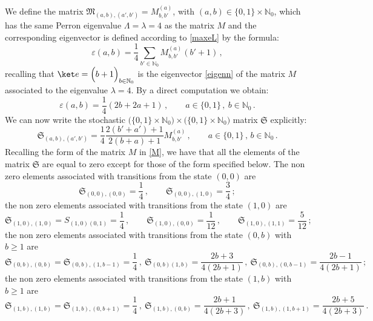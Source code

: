\documentclass[reqno]{amsart}
\theoremstyle{plain}
\theoremstyle{definition}
\theoremstyle{remark}
\numberwithin{equation}{section}
\numberwithin{theorem}{section}
\newcommand{\<}{\langle}
\renewcommand{\>}{\rangle}
\begin{document}
	We define the matrix $\mathfrak M_{(a,b),(a',b')}=M^{(a)}_{b,b'}$, with $(a,b) \in \{0,1\} \times \mathbb{N}_0$, which has the same Perron eigenvalue $\Lambda=\lambda=4$ as the matrix $M$ and the corresponding eigenvector is defined according to \eqref{maxeL} by the formula:
	\begin{equation*}
		\varepsilon(a,b)= \frac{1}{4} \sum_{b' \in \mathbb N_0} M^{(a)}_{b,b'}(b'+1)\,,
	\end{equation*}
	recalling that $\ket e=\Big(b+1\Big)_{b\in \mathbb N_0}$ is the eigenvector \eqref{eigenn} of the matrix $M$ associated to the eigenvalue $\lambda=4$. By a direct computation we obtain:
	\begin{equation*}
		\varepsilon(a,b)= \frac{1}{4} (2b+2a+1)\,, \qquad a\in\{0,1\}\,, \ b\in \mathbb N_0\,.
	\end{equation*}
	We can now write the stochastic $\Big(\{0,1\} \times \mathbb{N}_0 \Big)\times \Big(\{0,1\} \times \mathbb{N}_0\Big) $ matrix $\mathfrak S$ explicitly:
	\begin{equation}\label{MS}
		\mathfrak S_{(a,b),(a',b')}=\frac{1}{4} \frac{2(b'+a')+1}{2(b+a)+1} M^{(a)}_{b,b'}\,, \qquad a\in\{0,1\}\,,\, b\in \mathbb N_0\,.
	\end{equation}
	Recalling the form of the matrix $M$ in \eqref{M}, we have that all the elements of the matrix $\mathfrak S$ are equal to zero except for those of the form specified below. The non zero elements associated with transitions from the state $(0,0)$ are
	\begin{equation*}
		\mathfrak S_{(0,0),(0,0)}= \frac{1}{4}\,, \qquad  \mathfrak S_{(0,0),(1,0)}=\frac{3}{4}\,;
	\end{equation*}
	the non zero elements associated with transitions from the state $(1,0)$ are
	\begin{equation*}
		\mathfrak S_{(1,0),(1,0)}=S_{(1,0)(0,1)}=\frac{1}{4}\,, \qquad \mathfrak S_{(1,0),(0,0)}=\frac{1}{12}\,, \qquad \mathfrak S_{(1,0),(1,1)}=\frac{5}{12}\,;
	\end{equation*}
	the non zero elements associated with transitions from the state $(0,b)$ with $b\geq 1$ are
	\begin{equation*}
		\mathfrak S_{(0,b),(0,b)}=\mathfrak S_{(0,b),(1,b-1)}= \frac{1}{4}\,, \ \mathfrak S_{(0,b)(1,b)}=\frac{2b+3}{4(2b+1)}\,, \ \mathfrak S_{(0,b),(0,b-1)}=\frac{2b-1}{4(2b+1)}\,;
	\end{equation*}
	the non zero elements associated with transitions from the state $(1,b)$ with $b\geq 1$ are
	\begin{equation*}
		\mathfrak S_{(1,b),(1,b)}=\mathfrak S_{(1,b),(0,b+1)}=\frac{1}{4}\,, \ \mathfrak S_{(1,b),(0,b)}=\frac{2b+1}{4(2b+3)}\,, \ \mathfrak S_{(1,b),(1,b+1)}=\frac{2b+5}{4(2b+3)}\,.
	\end{equation*}
\end{document}
